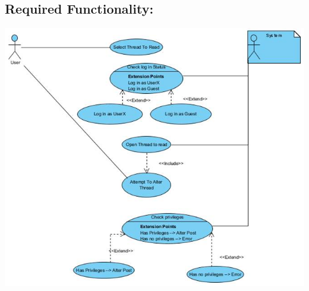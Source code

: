 \documentclass[a4paper,11pt]{article}
\begin{document}
\subsection{Required Functionality:} 
\includegraphics[width=1\linewidth]{./Images/CRUDThread/Diagrams/6.jpg}\\
\end{document}
